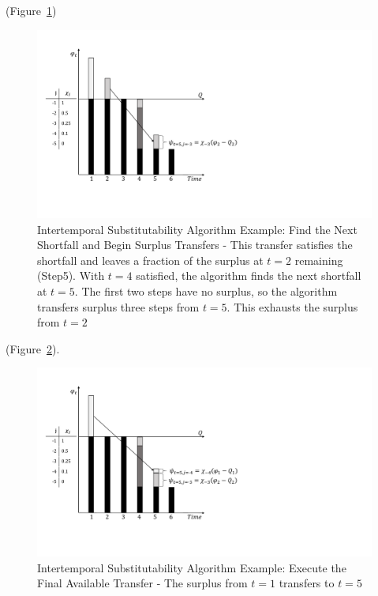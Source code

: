(Figure~\ref{f:Chi2-4})
\begin{figure}[h]
  \centering\includegraphics[width=\textwidth]{figures/Chi2-4.pdf}
  \caption{Intertemporal Substitutability Algorithm Example: Find the
    Next Shortfall and Begin Surplus Transfers - This transfer
    satisfies the shortfall and leaves a fraction of the surplus at
    $t=2$ remaining (Step5). With $t=4$ satisfied, the algorithm finds
    the next shortfall at $t=5$. The first two steps have no surplus,
    so the algorithm transfers surplus three steps from $t=5$. This
    exhausts the surplus from $t=2$}
  \label{f:Chi2-4}
\end{figure}
(Figure~\ref{f:Chi2-5}). 
\begin{figure}[h]
  \centering\includegraphics[width=\textwidth]{figures/Chi2-5.pdf}
  \caption{Intertemporal Substitutability Algorithm Example: Execute
    the Final Available Transfer - The surplus from $t=1$ transfers to
    $t=5$}
  \label{f:Chi2-5}
\end{figure}



